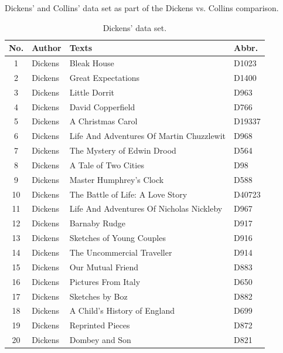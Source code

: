 \documentclass[a4paper,10pt,twoside,fleqn]{article}
\begin{document}
\begin{table}
    \caption{Dickens' and Collins' data set as part of the Dickens vs. Collins comparison.}
    \begin{minipage}{.62\linewidth}
      \caption{Dickens' data set.} %
      \centering
      \label{table:Dickens-data}
\begin{tabular}{c l l l} \\\hline \hline
\textbf{No.} 	& \textbf{Author} 	& \textbf{Texts} 			& \textbf{Abbr.} \\ \hline
1   		& Dickens 		& Bleak House 				& D1023     \\
2   		& Dickens		& Great Expectations			& D1400      \\
3		& Dickens      		& Little Dorrit     			& D963       \\
4		& Dickens      		& David Copperfield     		& D766        \\
5		& Dickens      		& A Christmas Carol     		& D19337       \\
6   		& Dickens		& Life And Adventures Of Martin Chuzzlewit	& D968        \\
7		& Dickens		& The Mystery of Edwin Drood		& D564   \\
8		& Dickens      		& A Tale of Two Cities                  & D98      \\
9		& Dickens		& Master Humphrey's Clock		& D588           \\
10		& Dickens		& The Battle of Life: A Love Story      & D40723              \\
11		& Dickens		&Life And Adventures Of Nicholas Nickleby	& D967          \\  
12		& Dickens		&Barnaby Rudge      			& D917             \\
13		& Dickens		& Sketches of Young Couples		& D916        \\
14		& Dickens		& The Uncommercial Traveller            & D914           \\
15		& Dickens		& Our Mutual Friend			& D883           \\
16		& Dickens		& Pictures From Italy			& D650    \\
17		& Dickens		& Sketches by Boz			& D882      \\
18		& Dickens		& A Child's History of England       	& D699  \\
19		& Dickens		& Reprinted Pieces			& D872   \\
20		& Dickens		& Dombey and Son			& D821     \\

\end{tabular}
\end{minipage}
\end{table}
\end{document}
